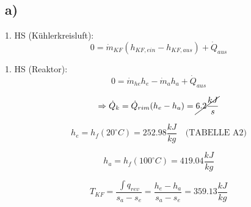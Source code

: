 

\subsection*{a)}
1. HS (Kühlerkreisluft): \[0 = \dot{m}_{KF} (h_{KF,ein} - h_{KF,aus}) + \dot{Q}_{aus}\]

1. HS (Reaktor): \[0 = \dot{m}_{he} h_{e} - \dot{m}_{a} h_{a} + \dot{Q}_{aus}\]

\[
\Rightarrow \dot{Q}_{k} = \dot{Q}_{rim} (h_{e} - h_{a}) = \cancel{6.2 \frac{kJ}{s}}
\]

\[
h_{e} = h_{f} (20^\circ C) = 252.98 \frac{kJ}{kg} \quad \text{(TABELLE A2)}
\]

\[
h_{a} = h_{f} (100^\circ C) = 419.04 \frac{kJ}{kg}
\]

\[
T_{KF} = \frac{\int q_{rev}}{s_{a} - s_{e}} = \frac{h_{e} - h_{a}}{s_{a} - s_{e}} = 359.13 \frac{kJ}{kg}
\]